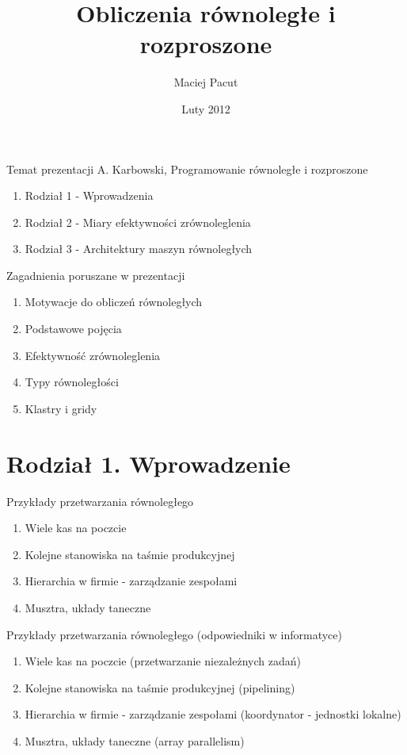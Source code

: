 \documentclass{beamer}
\title{Obliczenia równoległe i rozproszone}
\author{Maciej Pacut}
\date{Luty 2012}
\begin{document}
\begin{frame}
  \titlepage
\end{frame}

\begin{frame}{Temat prezentacji}
  A. Karbowski, Programowanie równoległe i rozproszone
  \begin{enumerate}
  \item Rodział 1 - Wprowadzenia
  \item Rodział 2 - Miary efektywności zrównoleglenia
  \item Rodział 3 - Architektury maszyn równoległych
  \end{enumerate}
\end{frame}

\begin{frame}{Zagadnienia poruszane w prezentacji}
  \begin{enumerate}
  \item Motywacje do obliczeń równoległych
  \item Podstawowe pojęcia
  \item Efektywność zrównoleglenia
  \item Typy równoległości
  \item Klastry i gridy
  \end{enumerate}
\end{frame}

\section{Rodział 1. Wprowadzenie}

\begin{frame}{Przykłady przetwarzania równoległego}
  \begin{enumerate}
  \item Wiele kas na poczcie
  \item Kolejne stanowiska na taśmie produkcyjnej
  \item Hierarchia w firmie - zarządzanie zespołami
  \item Musztra, układy taneczne
  \end{enumerate}
\end{frame}

\begin{frame}{Przykłady przetwarzania równoległego (odpowiedniki w informatyce)}
  \begin{enumerate}
  \item Wiele kas na poczcie (przetwarzanie niezależnych zadań)
  \item Kolejne stanowiska na taśmie produkcyjnej (pipelining)
  \item Hierarchia w firmie - zarządzanie zespołami (koordynator - jednostki lokalne)
  \item Musztra, układy taneczne (array parallelism)
  \end{enumerate}
\end{frame}
\end{document}
